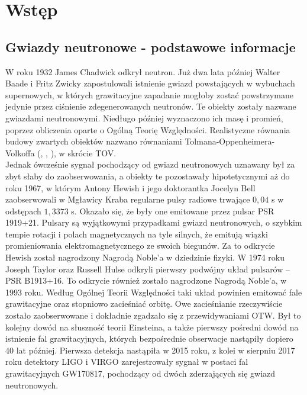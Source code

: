 \documentclass{bachelor_thesis}
\begin{document}
   \tableofcontents
    
    \chapter{Wstęp}
        \section{Gwiazdy neutronowe - podstawowe informacje}
        W roku 1932 James Chadwick odkrył neutron. Już dwa lata później Walter Baade i Fritz Zwicky zapostulowali istnienie gwiazd powstających w wybuchach supernowych, w których grawitacyjne zapadanie mogłoby zostać powstrzymane jedynie przez ciśnienie zdegenerowanych neutronów. Te obiekty zostały nazwane gwiazdami neutronowymi. Niedługo później wyznaczono ich masę i promień, poprzez obliczenia oparte o Ogólną Teorię Względności. Realistyczne równania budowy zwartych obiektów nazwano równaniami Tolmana-Oppenheimera-Volkoffa (\citealp{Tolman1934}, \citealp{Volkoff1939}, \citealp{Tolman1939}), w skrócie TOV.\\
        \indent Jednak ówcześnie sygnał pochodzący od gwiazd neutronowych uznawany był za zbyt słaby do zaobserwowania, a obiekty te pozostawały hipotetycznymi aż do roku 1967, w którym Antony Hewish i jego doktorantka Jocelyn Bell zaobserwowali w Mgławicy Kraba regularne pulsy radiowe trwające $0,04$ s w odstępach $1,3373$ s. Okazało się, że były one emitowane przez pulsar PSR 1919+21. Pulsary są wyjątkowymi przypadkami gwiazd neutronowych, o szybkim tempie rotacji i polach magnetycznych na tyle silnych, że emitują wiązki promieniowania elektromagnetycznego ze swoich biegunów. Za to odkrycie Hewish został nagrodzony Nagrodą Noble'a w dziedzinie fizyki. W 1974 roku Joseph Taylor oraz Russell Hulse odkryli pierwszy podwójny układ pulsarów -- PSR B1913+16. To odkrycie również zostało nagrodzone Nagrodą Noble'a, w 1993 roku. Według Ogólnej Teorii Względności taki układ powinien emitować fale grawitacyjne oraz stopniowo zacieśniać orbitę. Owe zacieśnianie rzeczywiście zostało zaobserwowane i dokładnie zgadzało się z przewidywaniami OTW. Był to kolejny dowód na słuszność teorii Einsteina, a także pierwszy pośredni dowód na istnienie fal grawitacyjnych, których bezpośrednie obserwacje nastąpiły dopiero 40 lat później. Pierwsza detekcja nastąpiła w 2015 roku, z kolei w sierpniu 2017 roku detektory LIGO i VIRGO zarejestrowały sygnał w postaci fal grawitacyjnych GW170817, pochodzący od dwóch zderzających się gwiazd neutronowych.\\
\end{document}
